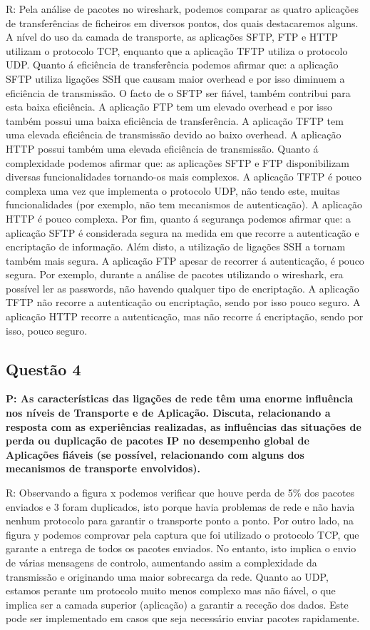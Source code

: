 \documentclass[a4paper]{article}
\begin{document}
R: Pela análise de pacotes no wireshark, podemos comparar as quatro aplicações de transferências de ficheiros em diversos pontos, dos quais destacaremos alguns.
A nível do uso da camada de transporte, as aplicações SFTP, FTP e HTTP utilizam o protocolo TCP, enquanto que a aplicação TFTP utiliza o protocolo UDP.
Quanto á eficiência de transferência podemos afirmar que: a aplicação SFTP utiliza ligações SSH que causam maior overhead e por isso diminuem a eficiência de transmissão. O facto de o SFTP ser fiável, também contribui para esta baixa eficiência. A aplicação FTP tem um elevado overhead e por isso também possui uma baixa eficiência de transferência. A aplicação TFTP tem uma elevada eficiência de transmissão devido ao baixo overhead. A aplicação HTTP possui também uma elevada eficiência de transmissão.
Quanto á complexidade podemos afirmar que: as aplicações SFTP e FTP disponibilizam diversas funcionalidades tornando-os mais complexos. A aplicação TFTP é pouco complexa uma vez que implementa o protocolo UDP, não tendo este, muitas funcionalidades (por exemplo, não tem mecanismos de autenticação). A aplicação HTTP é pouco complexa.
Por fim, quanto á segurança podemos afirmar que: a aplicação SFTP é considerada segura na medida em que recorre a autenticação e encriptação de informação. Além disto, a utilização de ligações SSH a tornam também mais segura. A aplicação FTP apesar de recorrer á autenticação, é pouco segura. Por exemplo, durante a análise de pacotes utilizando o wireshark, era possível ler as passwords, não havendo qualquer tipo de encriptação. A aplicação TFTP não recorre a autenticação ou encriptação, sendo por isso pouco seguro. A aplicação HTTP recorre a autenticação, mas não recorre á encriptação, sendo por isso, pouco seguro.

\vspace{12ex}

	\subsection{ Questão 4}   
\textbf {P: As  características  das ligações  de  rede  têm  uma  enorme  influência  nos  níveis  de  Transporte  e  de  Aplicação.  Discuta, relacionando a resposta com as experiências realizadas, as influências das situações de perda ou duplicação de pacotes IP no desempenho global de Aplicações fiáveis (se possível, relacionando com alguns dos mecanismos de transporte envolvidos).\\}


R: Observando a figura x podemos verificar que houve perda de 5\% dos pacotes enviados e 3 foram duplicados, isto porque havia problemas de rede e não havia nenhum protocolo para garantir o transporte ponto a ponto.
Por outro lado, na figura y podemos comprovar pela captura que foi utilizado o protocolo TCP, que garante a entrega de todos os pacotes enviados. No entanto, isto implica o envio de várias mensagens de controlo, aumentando assim a complexidade da transmissão e originando uma maior sobrecarga da rede.
Quanto ao UDP, estamos perante um protocolo muito menos complexo mas não fiável, o que implica ser a camada superior (aplicação) a garantir a receção dos dados. 
Este pode ser implementado em casos que seja necessário enviar pacotes rapidamente.
\end{document}
